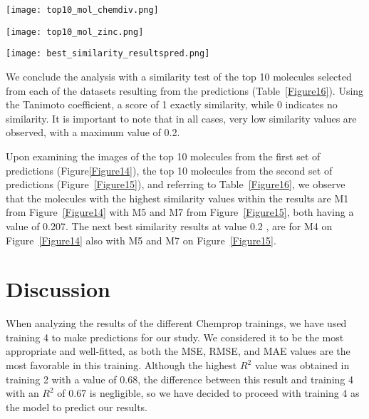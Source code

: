 \documentclass[final,times,twocolumn,article]{elsarticle}
\begin{document}
 \begin{figure*}
    \centering 
     \texttt{[image: top10\_mol\_chemdiv.png]}	
     \caption{The 10 molecules from the first predicted results (ChemDiv) with a higher activity value (pIC50)} 
     \label{Figure14}
 \end{figure*}

 \begin{figure*}
    \centering 
     \texttt{[image: top10\_mol\_zinc.png]}	
     \caption{The 10 molecules from the second predicted results (Zinc) with a higher activity value (pIC50)} 
     \label{Figure15}
 \end{figure*}

 \begin{figure*}
    \centering 
     \texttt{[image: best\_similarity\_resultspred.png]}	
     \caption{This table displays the results of the similarity analysis between the top molecules from each predicted dataset} 
     \label{Figure16}
 \end{figure*}

 We conclude the analysis with a similarity test of the top 10 molecules selected from each of the datasets resulting from the predictions (Table~\ref{Figure16}). Using the Tanimoto coefficient, a score of 1 exactly similarity, while 0 indicates no similarity. It is important to note that in all cases, very low similarity values are observed, with a maximum value of 0.2.

 Upon examining the images of the top 10 molecules from the first set of predictions (Figure{\ref{Figure14}}), the top 10 molecules from the second set of predictions (Figure~\ref{Figure15}), and referring to Table~\ref{Figure16}, we observe that the molecules with the highest similarity values within the results are M1 from Figure~\ref{Figure14} with M5 and M7 from Figure~\ref{Figure15}, both having a value of 0.207. The next best similarity results at value 0.2 , are for M4 on Figure~\ref{Figure14} also with M5 and M7 on Figure~\ref{Figure15}. 
 

\section{Discussion}

When analyzing the results of the different Chemprop trainings, we have used training 4 to make predictions for our study. We considered it to be the most appropriate and well-fitted, as both the MSE, RMSE, and MAE values are the most favorable in this training. Although the highest $R^2$ value was obtained in training 2 with a value of 0.68, the difference between this result and training 4 with an $R^2$ of 0.67 is negligible, so we have decided to proceed with training 4 as the model to predict our results.
\end{document}
